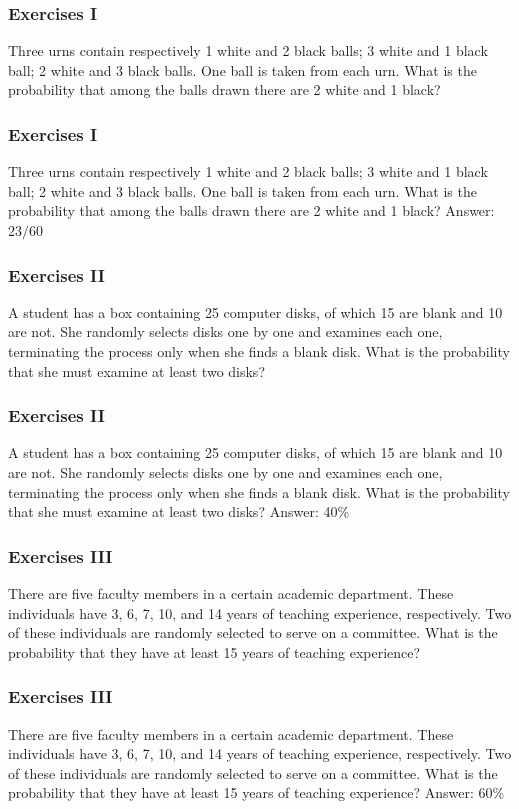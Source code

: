 \documentclass[xcolor=dvipsnames]{beamer}
\begin{document}
\begin{frame}
  \frametitle{Exercises I}
Three urns contain respectively 1 white and 2 black balls; 3 white and
1 black ball; 2 white and 3 black balls. One ball is taken from each
urn. What is the probability that among the balls drawn there are 2
white and 1 black?
\end{frame}

\begin{frame}
  \frametitle{Exercises I}
Three urns contain respectively 1 white and 2 black balls; 3 white and
1 black ball; 2 white and 3 black balls. One ball is taken from each
urn. What is the probability that among the balls drawn there are 2
white and 1 black? Answer: $23/60$
\end{frame}

\begin{frame}
  \frametitle{Exercises II}
A student has a box containing 25 computer disks, of which 15 are
blank and 10 are not. She randomly selects disks one by one and
examines each one, terminating the process only when she finds a blank
disk. What is the probability that she must examine at least two disks?
\end{frame}

\begin{frame}
  \frametitle{Exercises II}
A student has a box containing 25 computer disks, of which 15 are
blank and 10 are not. She randomly selects disks one by one and
examines each one, terminating the process only when she finds a blank
disk. What is the probability that she must examine at least two
disks? Answer: 40\%
\end{frame}

\begin{frame}
  \frametitle{Exercises III}
There are five faculty members in a certain academic department. These
individuals have 3, 6, 7, 10, and 14 years of teaching experience,
respectively. Two of these individuals are randomly selected to serve
on a committee. What is the probability that they have at least 15
years of teaching experience?
\end{frame}

\begin{frame}
  \frametitle{Exercises III}
There are five faculty members in a certain academic department. These
individuals have 3, 6, 7, 10, and 14 years of teaching experience,
respectively. Two of these individuals are randomly selected to serve
on a committee. What is the probability that they have at least 15
years of teaching experience? Answer: 60\%
\end{frame}
\end{document}
